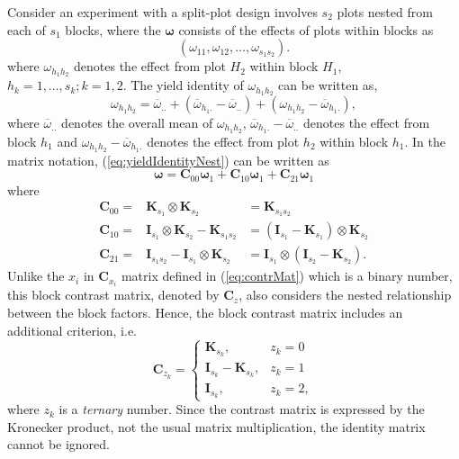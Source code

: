 \documentclass[article]{jss}
\newcommand{\I}{\mathbf{I}}
\newcommand{\K}{\mathbf{K}}
\newcommand{\C}{\mathbf{C}}
\begin{document}
Consider an experiment with a split-plot design involves $s_2$ plots nested from each of $s_1$ blocks, where the $\bm{\omega}$ consists of the effects of plots within blocks as    
\begin{equation}\label{eq:blockParSplitBlk1}
 (\omega_{11}, \omega_{12}, \dots, \omega_{s_1 s_2}). 
\end{equation}
where $\omega_{h_1 h_2}$ denotes the effect from plot $H_2$ within block $H_1$, $h_k = 1, \dots, s_k; k = 1, 2$. The yield identity of $\omega_{h_1 h_2}$ can be written as,
\begin{equation}
\label{eq:yieldIdentityNest}
\omega_{h_1 h_2} = \overline{\omega}_{..}+(\overline{\omega}_{h_1 .} -\overline{\omega}_{..}) + (\omega_{h_1 h_2} - \overline{\omega}_{h_1 .}),
\end{equation}
where $\overline{\omega}_{..}$ denotes the overall mean of $\omega_{h_1 h_2}$, $\overline{\omega}_{h_1 .} -\overline{\omega}_{..}$ denotes the effect from block $h_1$ and $\omega_{h_1 h_2} - \overline{\omega}_{h_1 .}$ denotes the effect from plot $h_2$ within block $h_1$. In the matrix notation, (\ref{eq:yieldIdentityNest}) can be written as 
\[
\bm{\omega} = \C_{00} \bm{\omega}_1 + \C_{10}\bm{\omega}_1 + \C_{21}\bm{\omega}_1
\]
where
\begin{eqnarray}
\nonumber \C_{00} = & \K_{s_1} \otimes \K_{s_2}& = \K_{s_1 s_2}\\
\nonumber \C_{10} = & \I_{s_1} \otimes \K_{s_2} - \K_{s_1 s_2}& = (\I_{s_1} - \K_{s_1}) \otimes \K_{s_2} \\
\nonumber \C_{21} = & \I_{s_1 s_2} - \I_{s_1} \otimes \K_{s_2} & =  \I_{s_1} \otimes (\I_{s_2} - \K_{s_2}).
\end{eqnarray}
Unlike the $x_i$ in $\C_{x_i}$ matrix defined in (\ref{eq:contrMat}) which is a binary number, this block contrast matrix, denoted by $\C_z$, also considers the nested relationship between the block factors. Hence, the block contrast matrix includes an additional criterion, i.e.\
\begin{equation}
\label{eq:contrMat1}
\C_{z_k} =
   \begin{cases}
       \K_{s_k}, & z_k = 0 \\
       \I_{s_k} - \K_{s_k}, & z_k = 1\\
        \I_{s_k}, & z_k = 2,
    \end{cases}
\end{equation}
where $z_k$ is a \emph{ternary} number. Since the contrast matrix is expressed by the Kronecker product, not the usual matrix multiplication, the identity matrix cannot be ignored. 
\end{document}
